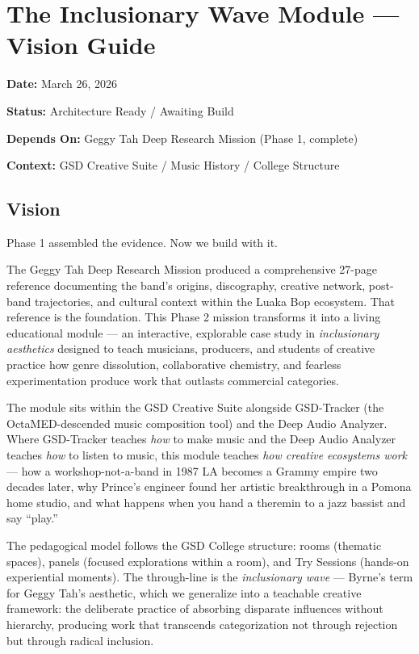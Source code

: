 \documentclass[11pt,letterpaper]{article}
\newcommand{\metafield}[2]{\textbf{\sffamily #1} #2\par}
\begin{document}
\section{The Inclusionary Wave Module --- Vision Guide}

\metafield{Date:}{March 26, 2026}
\metafield{Status:}{Architecture Ready / Awaiting Build}
\metafield{Depends On:}{Geggy Tah Deep Research Mission (Phase 1, complete)}
\metafield{Context:}{GSD Creative Suite / Music History / College Structure}

\subsection{Vision}

Phase 1 assembled the evidence. Now we build with it.

The Geggy Tah Deep Research Mission produced a comprehensive 27-page reference documenting the band's origins, discography, creative network, post-band trajectories, and cultural context within the Luaka Bop ecosystem. That reference is the foundation. This Phase 2 mission transforms it into a living educational module --- an interactive, explorable case study in \textit{inclusionary aesthetics} designed to teach musicians, producers, and students of creative practice how genre dissolution, collaborative chemistry, and fearless experimentation produce work that outlasts commercial categories.

The module sits within the GSD Creative Suite alongside GSD-Tracker (the OctaMED-descended music composition tool) and the Deep Audio Analyzer. Where GSD-Tracker teaches \textit{how} to make music and the Deep Audio Analyzer teaches \textit{how} to listen to music, this module teaches \textit{how creative ecosystems work} --- how a workshop-not-a-band in 1987 LA becomes a Grammy empire two decades later, why Prince's engineer found her artistic breakthrough in a Pomona home studio, and what happens when you hand a theremin to a jazz bassist and say ``play.''

The pedagogical model follows the GSD College structure: rooms (thematic spaces), panels (focused explorations within a room), and Try Sessions (hands-on experiential moments). The through-line is the \textit{inclusionary wave} --- Byrne's term for Geggy Tah's aesthetic, which we generalize into a teachable creative framework: the deliberate practice of absorbing disparate influences without hierarchy, producing work that transcends categorization not through rejection but through radical inclusion.
\end{document}
